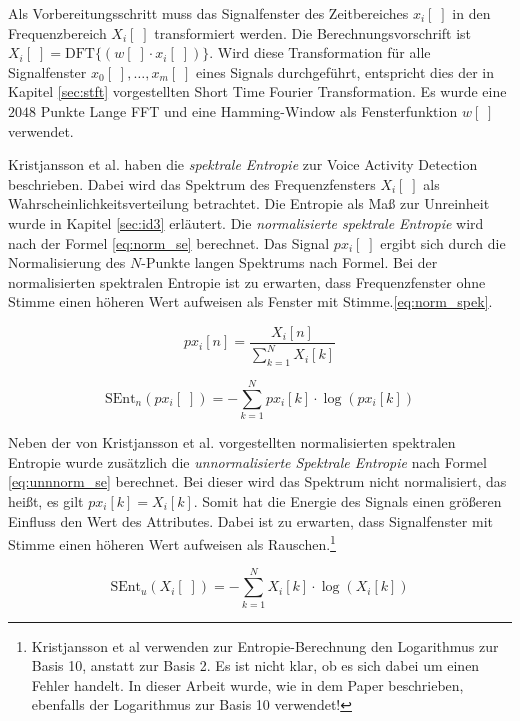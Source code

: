 Als Vorbereitungsschritt muss das Signalfenster des Zeitbereiches $x_i[\;]$ in den Frequenzbereich $X_i[\;]$ transformiert werden. Die Berechnungsvorschrift ist $X_i[\;] = \text{DFT}\{(w[\;] \cdot x_i[\;])\}$. Wird diese Transformation für alle Signalfenster $x_0[\;], \ldots, x_m[\;]$ eines Signals durchgeführt, entspricht dies der in Kapitel \ref{sec:stft} vorgestellten Short Time Fourier Transformation. Es wurde eine $2048$ Punkte Lange FFT und eine Hamming-Window als Fensterfunktion $w[\;]$ verwendet.

Kristjansson et al. \cite[S. 2]{vad_Lisboa} haben die \emph{spektrale Entropie} zur Voice Activity Detection beschrieben. Dabei wird das Spektrum des Frequenzfensters $X_i[\;]$ als Wahrscheinlichkeitsverteilung betrachtet. Die Entropie als Maß zur \glqq Unreinheit\grqq{} wurde in Kapitel \ref{sec:id3} erläutert. Die \emph{normalisierte spektrale Entropie} wird nach der Formel \ref{eq:norm_se} berechnet. Das Signal $px_i[\;]$ ergibt sich durch die Normalisierung des $N$-Punkte langen Spektrums nach Formel. Bei der normalisierten spektralen Entropie ist zu erwarten, dass Frequenzfenster ohne Stimme einen höheren Wert aufweisen als Fenster mit Stimme.\ref{eq:norm_spek}. 

\begin{equation}
px_i[n] = \frac{X_i[n]}{\sum_{k=1}^{N} X_i[k]}
\label{eq:norm_spek}
\end{equation}

\begin{equation}
\text{SEnt}_n(px_i[\;]) = -\sum_{k=1}^{N}px_i[k] \cdot\log(px_i[k])
\label{eq:norm_se}
\end{equation}

Neben der von Kristjansson et al. \cite{vad_Lisboa} vorgestellten normalisierten spektralen Entropie wurde zusätzlich die \emph{unnormalisierte Spektrale Entropie} nach Formel \ref{eq:unnnorm_se} berechnet. Bei dieser wird das Spektrum nicht normalisiert, das heißt, es gilt $px_i[k] = X_i[k]$. Somit hat die Energie des Signals einen größeren Einfluss den Wert des Attributes. Dabei ist zu erwarten, dass Signalfenster mit Stimme einen höheren Wert aufweisen als Rauschen.\footnote{Kristjansson et al \cite[S. 2]{vad_Lisboa} verwenden zur Entropie-Berechnung den Logarithmus zur Basis 10, anstatt zur Basis 2. Es ist nicht klar, ob es sich dabei um einen Fehler handelt. In dieser Arbeit wurde, wie in dem Paper beschrieben, ebenfalls der Logarithmus zur Basis 10 verwendet!}

\begin{equation}
\text{SEnt}_u(X_i[\;]) = -\sum_{k=1}^{N}X_i[k] \cdot\log(X_i[k])
\label{eq:unnnorm_se}
\end{equation}

